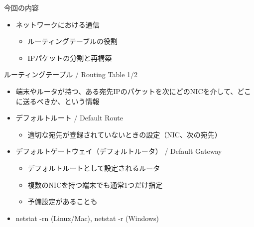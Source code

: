 \documentclass[12pt,aspectratio=169]{beamer}
\begin{document}
\begin{frame}{今回の内容}

  \begin{itemize}
    \item ネットワークにおける通信
      \begin{itemize}
        \item ルーティングテーブルの役割
        \item IPパケットの分割と再構築
      \end{itemize}

  \end{itemize}

\end{frame}


\begin{frame}{ルーティングテーブル / Routing Table 1/2}

  \begin{itemize}
    \item 端末やルータが持つ、ある宛先IPのパケットを次にどのNICを介して、どこに送るべきか、という情報
    \item デフォルトルート / Default Route
      \begin{itemize}
        \item 適切な宛先が登録されていないときの設定（NIC、次の宛先）
      \end{itemize}
    \item デフォルトゲートウェイ（デフォルトルータ） / Default Gateway
      \begin{itemize}
        \item デフォルトルートとして設定されるルータ
        \item 複数のNICを持つ端末でも通常1つだけ指定
        \item 予備設定があることも %
      \end{itemize}
    \item netstat -rn (Linux/Mac), netstat -r (Windows)

  \end{itemize}

\end{frame}
\end{document}
